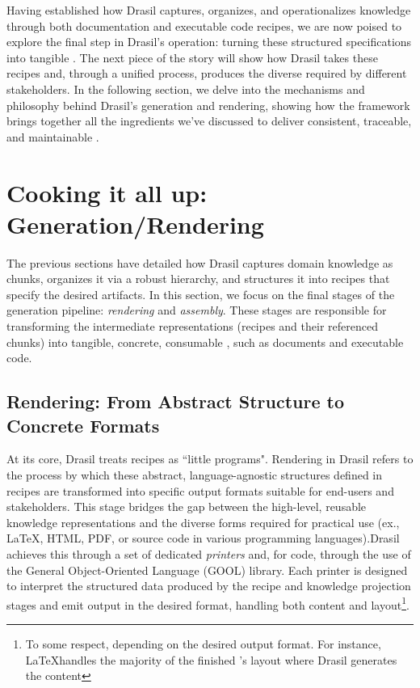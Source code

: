 
Having established how Drasil captures, organizes, and operationalizes 
knowledge through both documentation and executable code recipes, we are now 
poised to explore the final step in Drasil's operation: turning these 
structured specifications into tangible \sfs{}. The next piece of the story 
will show how Drasil takes these recipes and, through a unified process, 
produces the diverse \sfs{} required by different stakeholders. In the 
following section, we delve into the mechanisms and philosophy behind Drasil's 
generation and rendering, showing how the framework brings together all the 
ingredients we've discussed to deliver consistent, traceable, and maintainable 
\sfs{}.

\section{Cooking it all up: Generation/Rendering}
\label{sec:gen}

The previous sections have detailed how Drasil captures domain knowledge as 
chunks, organizes it via a robust hierarchy, and structures it into recipes 
that specify the desired artifacts. In this section, we focus on the final 
stages of the generation pipeline: \emph{rendering} and \emph{assembly}. These 
stages are responsible for transforming the intermediate representations 
(recipes and their referenced chunks) into tangible, concrete, consumable 
\sfs{}, such as documents and executable code.

\subsection{Rendering: From Abstract Structure to Concrete Formats}

At its core, Drasil treats recipes as ``little programs". Rendering in Drasil 
refers to the process by which these abstract, language-agnostic structures 
defined in recipes are transformed into specific output formats suitable for 
end-users and stakeholders. This stage bridges the gap between the high-level, 
reusable knowledge representations and the diverse forms required for practical 
use (ex., \LaTeX{}, HTML, PDF, or source code in various programming 
languages).Drasil achieves this through a set of dedicated \emph{printers} and, 
for code, through the use of the General Object-Oriented Language 
(GOOL)\cite{??} library. Each printer is designed to interpret the structured 
data produced by the recipe and knowledge projection stages and emit output in 
the desired format, handling both content and layout\footnote{To some respect, 
depending on the desired output format. For instance, \LaTeX handles the 
majority of the finished \sf{}'s layout where Drasil generates the content}.

